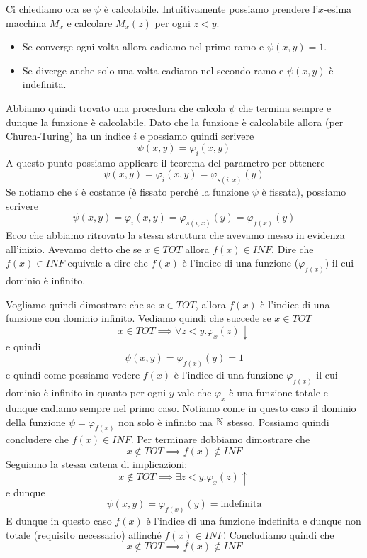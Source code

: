 Ci chiediamo ora se $\psi$ è calcolabile. Intuitivamente possiamo
prendere l'$x$-esima macchina $M_x$ e calcolare $M_x (z)$ per ogni
$z < y$.
\begin{itemize}
	\item Se converge ogni volta allora cadiamo nel primo ramo e
	      $\psi(x, y) = 1$.
	\item Se diverge anche solo una volta cadiamo nel secondo ramo e
	      $\psi(x,y)$ è indefinita.
\end{itemize}
Abbiamo quindi trovato una procedura che calcola $\psi$ che
termina sempre e dunque la funzione è calcolabile. Dato che la
funzione è calcolabile allora (per Church-Turing) ha un indice
$i$ e possiamo quindi scrivere
\[ \psi(x, y) = \varphi_i (x, y) \]
A questo punto possiamo applicare il teorema del parametro per
ottenere
\[ \psi(x, y) = \varphi_i (x, y) = \varphi_{s(i,x)} (y) \]
Se notiamo che $i$ è costante (è fissato perché la funzione
$\psi$ è fissata), possiamo scrivere
\[
	\psi(x, y) = \varphi_i (x, y) =
	\varphi_{s(i,x)} (y) = \varphi_{f(x)} (y)
\]
Ecco che abbiamo ritrovato la stessa struttura che avevamo messo
in evidenza all'inizio. Avevamo detto che se $x \in TOT$ allora
$f(x) \in INF$. Dire che $f(x) \in INF$ equivale a dire che
$f(x)$ è l'indice di una funzione ($\varphi_{f(x)}$) il cui dominio
è infinito.

Vogliamo quindi dimostrare che se $x \in TOT$, allora $f(x)$ è
l'indice di una funzione con dominio infinito. Vediamo quindi che
succede se $x \in TOT$
\[ x \in TOT \implies \forall z < y . \varphi_x (z) \downarrow \]
e quindi
\[ \psi (x, y) = \varphi_{f(x)} (y) = 1 \]
e quindi come possiamo vedere $f(x)$ è l'indice di una funzione
$\varphi_{f(x)}$ il cui dominio è infinito in quanto per ogni $y$
vale che $\varphi_x$ è una funzione totale e dunque cadiamo sempre
nel primo caso. Notiamo come in questo caso il dominio della funzione
$\psi = \varphi_{f(x)}$ non solo è infinito ma $\mathbb{N}$ stesso. Possiamo
quindi concludere che $f(x) \in INF$. Per terminare dobbiamo dimostrare
che
\[ x \notin TOT \implies f(x) \notin INF \]
Seguiamo la stessa catena di implicazioni:
\[ x \notin TOT \implies \exists z < y . \varphi_x (z) \uparrow \]
e dunque
\[ \psi (x, y) = \varphi_{f(x)} (y) = \text{indefinita} \]
E dunque in questo caso $f(x)$ è l'indice di una funzione
indefinita e dunque non totale (requisito necessario) affinché
$f(x) \in INF$. Concludiamo quindi che
\[ x \notin TOT \implies f(x) \notin INF \]